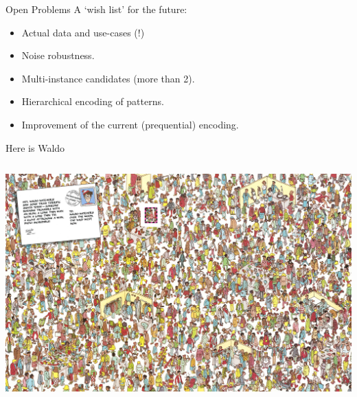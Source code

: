 \documentclass[11pt]{beamer}
\begin{document}

\begin{frame}{Open Problems}
A `wish list' for the future:
\begin{itemize}
\item Actual data and use-cases (!)
\item Noise robustness.
\item Multi-instance candidates (more than 2).
\item Hierarchical encoding of patterns.
\item Improvement of the current (prequential) encoding.
\end{itemize}
\end{frame}


\begin{frame}{Here is Waldo}
\nointerlineskip%
\begin{columns}
\column{\dimexpr\paperwidth}
\centering
\includegraphics[width=\paperwidth]{"here is waldo"} 
\end{columns}
\end{frame}
\end{document}
